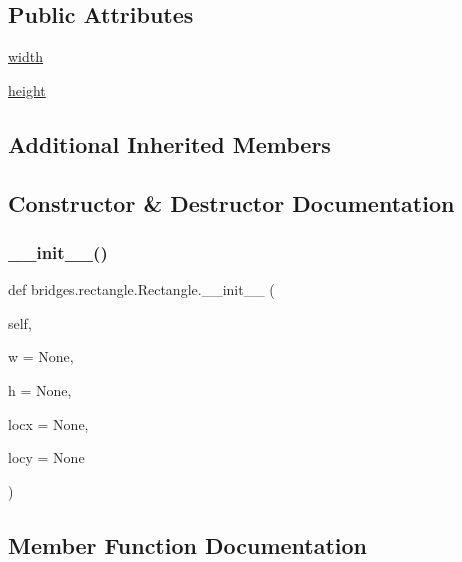 \subsection*{Public Attributes}
\begin{DoxyCompactItemize}
\item 
\mbox{\hyperlink{classbridges_1_1rectangle_1_1_rectangle_ac70360e861fb0dfab5fae8525ffc86ba}{width}}
\item 
\mbox{\hyperlink{classbridges_1_1rectangle_1_1_rectangle_a3b7a2448881d5eea95e86aac8dfae467}{height}}
\end{DoxyCompactItemize}
\subsection*{Additional Inherited Members}


\subsection{Constructor \& Destructor Documentation}
\mbox{\label{classbridges_1_1rectangle_1_1_rectangle_a8cc157b5aaf7ae647cff1c778353c438}} 
\subsubsection{\texorpdfstring{\+\_\+\+\_\+init\+\_\+\+\_\+()}{\_\_init\_\_()}}
{\footnotesize\ttfamily def bridges.\+rectangle.\+Rectangle.\+\_\+\+\_\+init\+\_\+\+\_\+ (\begin{DoxyParamCaption}\item[{}]{self,  }\item[{}]{w = {\ttfamily None},  }\item[{}]{h = {\ttfamily None},  }\item[{}]{locx = {\ttfamily None},  }\item[{}]{locy = {\ttfamily None} }\end{DoxyParamCaption})}



\subsection{Member Function Documentation}
\mbox{\label{classbridges_1_1rectangle_1_1_rectangle_a3f3823c7058ee639a92494276c2c9f22}} 
